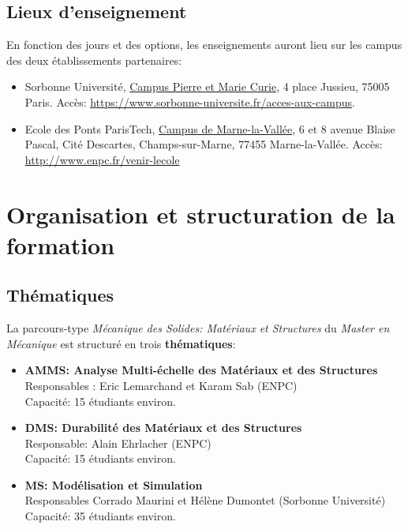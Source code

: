 \documentclass[french,11pt]{article}
\begin{document}
\subsection{Lieux d'enseignement}

En fonction des jours et des options, les enseignements auront lieu sur les campus des deux établissements partenaires:
\begin{itemize}
\item
  Sorbonne Université, \href{https://www.openstreetmap.org/#map=17/48.84691/2.35506}{Campus Pierre et Marie Curie}, 4 place Jussieu, 75005 Paris. Accès: \url{https://www.sorbonne-universite.fr/acces-aux-campus}.
\item
  Ecole des Ponts ParisTech, \href{https://www.openstreetmap.org/search?query=%208%20avenue%20Blaise-%20Pascal%20%20-%20Cité%20Descartes%20-%20Champs-sur-Marne%20#map=18/48.84171/2.58699}{Campus de Marne-la-Vallée}, 
6 et 8 avenue Blaise Pascal, Cité Descartes,
Champs-sur-Marne, 77455 Marne-la-Vallée. Accès: \url{http://www.enpc.fr/venir-lecole}
\end{itemize}

\newpage


\section{Organisation et structuration de la formation}

\subsection{Thématiques}
La parcours-type \emph{Mécanique des Solides: Matériaux et Structures} du
\emph{Master en Mécanique} est structuré en trois \textbf{thématiques}:

\begin{itemize}
\item
  \textbf{AMMS: Analyse Multi-échelle des Matériaux et des Structures\\
  }Responsables : Eric Lemarchand et Karam Sab (ENPC)\\
  Capacité: 15 étudiants environ. 
\item
  \textbf{DMS: Durabilité des Matériaux et des Structures}\\
  Responsable: Alain Ehrlacher (ENPC)\\
  Capacité: 15 étudiants environ. 
\item
  \textbf{MS: Modélisation et Simulation}\\
  Responsables Corrado Maurini et Hélène Dumontet (Sorbonne Université)\\
  Capacité: 35 étudiants environ. 
\end{itemize}
\end{document}
